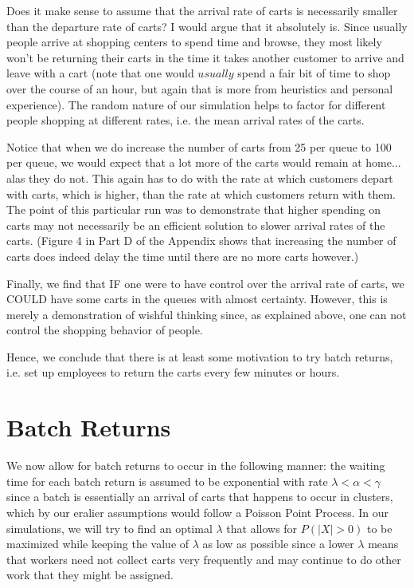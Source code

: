 \documentclass[english]{article}
\begin{document}
Does it make sense to assume that the arrival rate of carts is necessarily smaller than the departure rate of carts? I would argue that it absolutely is. Since usually people arrive at shopping centers to spend time and browse, they most likely won't be returning their carts in the time it takes another customer to arrive and leave with a cart (note that one would $usually$ spend a fair bit of time to shop over the course of an hour, but again that is more from heuristics and personal experience). The random nature of our simulation helps to factor for different people shopping at different rates, i.e. the mean arrival rates of the carts.

Notice that when we do increase the number of carts from 25 per queue to 100 per queue, we would expect that a lot more of the carts would remain at home... alas they do not. This again has to do with the rate at which customers depart with carts, which is higher, than the rate at which customers return with them. The point of this particular run was to demonstrate that higher spending on carts may not necessarily be an efficient solution to slower arrival rates of the carts. (Figure 4 in Part D of the Appendix shows that increasing the number of carts does indeed delay the time until there are no more carts however.)

Finally, we find that IF one were to have control over the arrival rate of carts, we COULD have some carts in the queues with almost certainty. However, this is merely a demonstration of wishful thinking since, as explained above, one can not control the shopping behavior of people.

Hence, we conclude that there is at least some motivation to try batch returns, i.e. set up employees to return the carts every few minutes or hours.

\section*{Batch Returns}

We now allow for batch returns to occur in the following manner: the waiting time for each batch return is assumed to be exponential with rate $\lambda<\alpha<\gamma$ since a batch is essentially an arrival of carts that happens to occur in clusters, which by our eralier assumptions would follow a Poisson Point Process. In our simulations, we will try to find an optimal $\lambda$ that allows for $P(|X|>0)$ to be maximized while keeping the value of $\lambda$ as low as possible since a lower $\lambda$ means that workers need not collect carts very frequently and may continue to do other work that they might be assigned.
\end{document}
